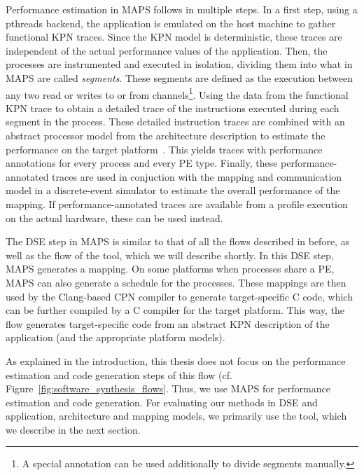 Performance estimation in \ac{MAPS} follows in multiple steps.
In a first step, using a \acp{pthread} backend, the application is emulated on the host machine to gather functional \ac{KPN} traces.
Since the \ac{KPN} model is deterministic, these traces are independent of the actual performance values of the application.
Then, the processes are instrumented and executed in isolation, dividing them into what in \ac{MAPS} are called \emph{segments}.
These segments are defined as the execution between any two read or writes to or from channels\footnote{A special annotation can be used additionally to divide segments manually.}.
Using the data from the functional \ac{KPN} trace to obtain a detailed trace of the instructions executed during each segment in the process.
These detailed instruction traces are combined with an abstract processor model from the architecture description to estimate the performance on the target platform~\cite{eusse2014pre}.
This yields traces with performance annotations for every process and every \ac{PE} type.
Finally, these performance-annotated traces are used in conjuction with the mapping and communication model in a discrete-event simulator to estimate the overall performance of the mapping.
If performance-annotated traces are available from a profile execution on the actual hardware, these can be used instead.

The \ac{DSE} step in \ac{MAPS} is similar to that of all the flows described in before, as well as the flow of the \mocasin tool, which we will describe shortly. 
In this \ac{DSE} step, \ac{MAPS} generates a mapping.
On some platforms when processes share a \ac{PE}, \ac{MAPS} can also generate a schedule for the processes.
These mappings are then used by the Clang-based \ac{CPN} compiler to generate target-specific C code, which can be further compiled by a C compiler for the target platform.
This way, the flow generates target-specific code from an abstract \ac{KPN} description of the application (and the appropriate platform models).

As explained in the introduction, this thesis does not focus on the performance estimation and code generation steps of this flow (cf. Figure~\ref{fig:software_synthesis_flows}.
Thus, we use \ac{MAPS} for performance estimation and code generation.
For evaluating our methods in \ac{DSE} and application, architecture and mapping models, we primarily use the \mocasin tool, which we describe in the next section.